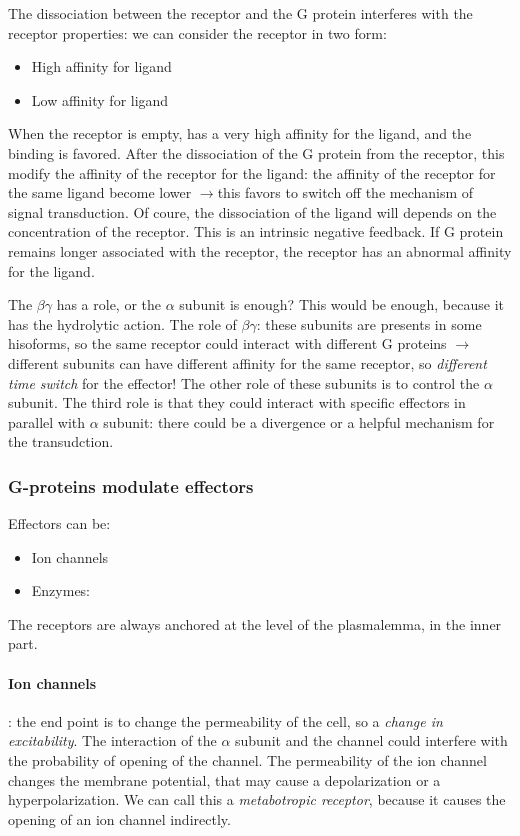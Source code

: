 \documentclass[a4paper, 12pt]{book}
\newcommand{\lfreccia}{\ensuremath{\longrightarrow}}
\begin{document}
The dissociation between the receptor and the G protein interferes with the receptor properties: we can consider the receptor in two form:
\begin{itemize}
\item{High affinity for ligand}
\item{Low affinity for ligand}
\end{itemize}

When the receptor is empty, has a very high affinity for the ligand, and the binding is favored. After the dissociation of the G protein from the receptor, this modify the affinity of the receptor for the ligand: the affinity of the receptor for the same ligand become lower \lfreccia this favors to switch off the mechanism of signal transduction. Of coure, the dissociation of the ligand will depends on the concentration of the receptor. This is an intrinsic negative feedback. If G protein remains longer associated with the receptor, the receptor has an abnormal affinity for the ligand. 

The $\beta \gamma$ has a role, or the $\alpha$ subunit is enough? This would be enough, because it has the hydrolytic action. The role of $\beta \gamma$: these subunits are presents in some hisoforms, so the same receptor could interact with different G proteins \lfreccia different subunits can have different affinity for the same receptor, so \emph{different time switch} for the effector! The other role of these subunits is to control the $\alpha$ subunit. The third role is that they could interact with specific effectors in parallel with $\alpha$ subunit: there could be a divergence or a helpful mechanism for the transudction.

\subsubsection{G-proteins modulate effectors}
Effectors can be:
\begin{itemize}
\item{Ion channels}
\item{Enzymes: }
\end{itemize}

The receptors are always anchored at the level of the plasmalemma, in the inner part.

\paragraph{Ion channels}: the end point is to change the permeability of the cell, so a \emph{change in excitability}. The interaction of the $\alpha$ subunit and the channel could interfere with the probability of opening of the channel. The permeability of the ion channel changes the membrane potential, that may cause a depolarization or a hyperpolarization. We can call this a \emph{metabotropic receptor}, because it causes the opening of an ion channel indirectly.
\end{document}
